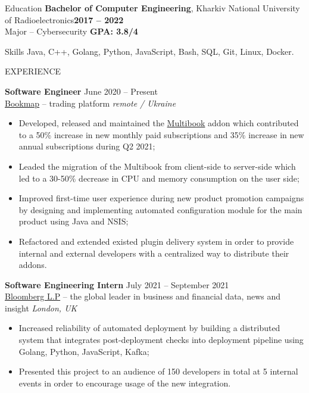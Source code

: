 \documentclass{resume} %
\begin{document}
\begin{rSection}{Education}
{\bf Bachelor of  Computer Engineering}, Kharkiv National University of Radioelectronics\hfill {\bf 2017 -- 2022}\\
Major -- Cybersecurity \hfill {\bf GPA: 3.8/4}
\end{rSection}

\begin{rSection}{Skills}
Java, C++, Golang, Python, JavaScript, Bash, SQL, Git, Linux, Docker.
\end{rSection}

\begin{rSection}{EXPERIENCE}
\vspace{1mm}

\textbf{Software Engineer} \hfill June 2020 -- Present\\
\href{{https://bookmap.com/}}{Bookmap} -- trading platform \hfill \textit{remote / Ukraine}
 \begin{itemize}[topsep=2pt, itemsep=7pt,parsep=-5pt]
     \item Developed, released and maintained the \href{{https://bookmap.com/knowledgebase/docs/Addons-Multibook}}{Multibook} addon which contributed to a 50\% increase in new monthly paid subscriptions and 35\% increase in new annual subscriptions during Q2 2021;
     \item Leaded the migration of the Multibook from client-side to server-side which led to a 30-50\% decrease in CPU and memory consumption on the user side;
     \item Improved first-time user experience during new product promotion campaigns by designing and implementing automated configuration module for the main product using Java and NSIS;
    \item Refactored and extended existed plugin delivery system in order to provide internal and external developers with a centralized way to distribute their addons.
\end{itemize}

\textbf{Software Engineering Intern} \hfill July 2021 -- September 2021\\
\href{{https://www.bloomberg.com/company}}{Bloomberg L.P} -- the global leader in business and financial data, news and insight \hfill \textit{London, UK}\\
\vspace{-3.5mm}
 \begin{itemize}[topsep=1pt, itemsep=7pt,parsep=-5pt]
     \item Increased reliability of automated deployment by building a distributed system that integrates post-deployment checks into deployment pipeline using Golang, Python, JavaScript, Kafka;
    \item Presented this project to an audience of 150 developers in total at 5 internal events in order to encourage usage of the new integration.
 \end{itemize}
 

\end{rSection}
\end{document}
